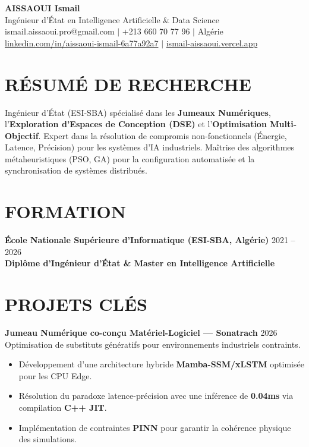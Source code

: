 \documentclass[a4paper,11pt]{article}
\begin{document}
\begin{center}
    {\Huge\bfseries\color{titleblue} AISSAOUI Ismail}\\[4pt]
    {\Large Ingénieur d'État en Intelligence Artificielle \& Data Science}\\[6pt]
    ismail.aissaoui.pro@gmail.com $|$ +213 660 70 77 96 $|$ Algérie \\
    \href{https://linkedin.com/in/aissaoui-ismail-6a77a92a7}{linkedin.com/in/aissaoui-ismail-6a77a92a7} $|$ \href{https://ismail-aissaoui.vercel.app}{ismail-aissaoui.vercel.app}
\end{center}

\section{RÉSUMÉ DE RECHERCHE}
Ingénieur d'État (ESI-SBA) spécialisé dans les \textbf{Jumeaux Numériques}, l'\textbf{Exploration d'Espaces de Conception (DSE)} et l'\textbf{Optimisation Multi-Objectif}. Expert dans la résolution de compromis non-fonctionnels (Énergie, Latence, Précision) pour les systèmes d'IA industriels. Maîtrise des algorithmes métaheuristiques (PSO, GA) pour la configuration automatisée et la synchronisation de systèmes distribués.

\section{FORMATION}
\textbf{École Nationale Supérieure d'Informatique (ESI-SBA, Algérie)} \hfill 2021 -- 2026 \\
\textbf{Diplôme d'Ingénieur d'État \& Master en Intelligence Artificielle}

\section{PROJETS CLÉS}

\textbf{Jumeau Numérique co-conçu Matériel-Logiciel — Sonatrach} \hfill 2026 \\
Optimisation de substituts génératifs pour environnements industriels contraints.
\begin{itemize}
    \item Développement d'une architecture hybride \textbf{Mamba-SSM/xLSTM} optimisée pour les CPU Edge.
    \item Résolution du paradoxe latence-précision avec une inférence de \textbf{0.04ms} via compilation \textbf{C++ JIT}.
    \item Implémentation de contraintes \textbf{PINN} pour garantir la cohérence physique des simulations.
\end{itemize}
\end{document}
